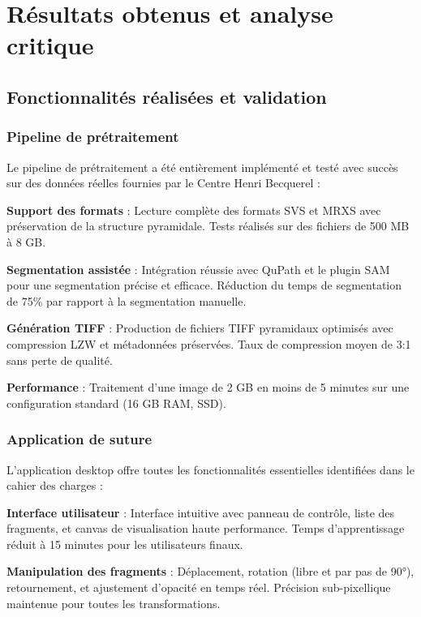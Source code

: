 \documentclass[12pt,a4paper]{report}
\begin{document}
\section{Résultats obtenus et analyse critique}

\subsection{Fonctionnalités réalisées et validation}

\subsubsection{Pipeline de prétraitement}

Le pipeline de prétraitement a été entièrement implémenté et testé avec succès sur des données réelles fournies par le Centre Henri Becquerel :

\textbf{Support des formats} : Lecture complète des formats SVS et MRXS avec préservation de la structure pyramidale. Tests réalisés sur des fichiers de 500 MB à 8 GB.

\textbf{Segmentation assistée} : Intégration réussie avec QuPath et le plugin SAM pour une segmentation précise et efficace. Réduction du temps de segmentation de 75\% par rapport à la segmentation manuelle.

\textbf{Génération TIFF} : Production de fichiers TIFF pyramidaux optimisés avec compression LZW et métadonnées préservées. Taux de compression moyen de 3:1 sans perte de qualité.

\textbf{Performance} : Traitement d'une image de 2 GB en moins de 5 minutes sur une configuration standard (16 GB RAM, SSD).

\subsubsection{Application de suture}

L'application desktop offre toutes les fonctionnalités essentielles identifiées dans le cahier des charges :

\textbf{Interface utilisateur} : Interface intuitive avec panneau de contrôle, liste des fragments, et canvas de visualisation haute performance. Temps d'apprentissage réduit à 15 minutes pour les utilisateurs finaux.

\textbf{Manipulation des fragments} : Déplacement, rotation (libre et par pas de 90°), retournement, et ajustement d'opacité en temps réel. Précision sub-pixellique maintenue pour toutes les transformations.
\end{document}
